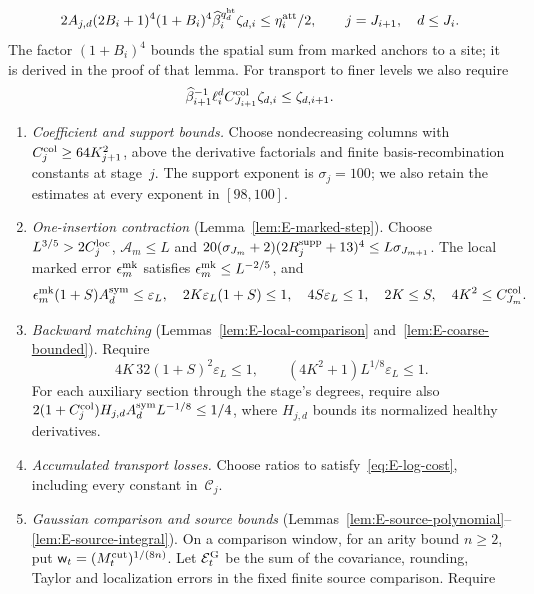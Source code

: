 \begin{equation}\label{eq:E-attachment-allowance}
 2A_{j,d}(2B_i+1)^4(1+B_i)^4
 \widehat\beta_i^{q^{\rm ht}_d}\zeta_{d,i}\le\eta^{\rm att}_i/2,
 \qquad j=J_{i+1},\quad d\le J_i.
\end{equation}
The factor $(1+B_i)^4$ bounds the spatial sum from marked anchors to a site; it is derived in the proof of that lemma. For transport to finer levels we also require
\begin{equation}\label{eq:E-source-allowance-transport}
 \widehat\beta_{i+1}^{-1}\ell_i^d C^{\rm col}_{J_{i+1}}\zeta_{d,i}
 \le\zeta_{d,i+1}.
\end{equation}
\begin{enumerate}
\item\label{it:E-columns} \emph{Coefficient and support bounds.} Choose nondecreasing columns with $C^{\rm col}_j\ge64K_{j+1}^2$, above the derivative factorials and finite basis-recombination constants at stage~$j$. The support exponent is $\sigma_j=100$; we also retain the estimates at every exponent in $[98,100]$.
\item\label{it:E-graph} \emph{One-insertion contraction} (Lemma~\ref{lem:E-marked-step}). Choose $L^{3/5}>2C_j^{\rm loc}$, $\mathcal A_m\le L$ and $20(\sigma_{J_m}+2)(2R_j^{\rm supp}+13)^4\le L\sigma_{J_{m+1}}$. The local marked error $\epsilon^{\rm mk}_m$ satisfies $\epsilon^{\rm mk}_m\le L^{-2/5}$, and
\begin{equation}\label{eq:E-graph-reserve}
 \epsilon^{\rm mk}_m(1+S)A_d^{\rm sym}\le\varepsilon_L,\quad
 2K\varepsilon_L(1+S)\le1,\quad4S\varepsilon_L\le1,\quad
 2K\le S,\quad4K^2\le C^{\rm col}_{J_m}.
\end{equation}
\item\label{it:E-match} \emph{Backward matching} (Lemmas~\ref{lem:E-local-comparison} and~\ref{lem:E-coarse-bounded}). Require
\begin{equation}\label{eq:E-matching-choices}
 4K\,32(1+S)^2\varepsilon_L\le1,\qquad
 (4K^2+1)L^{1/8}\varepsilon_L\le1.
\end{equation}
For each auxiliary section through the stage's degrees, require also $2(1+C^{\rm col}_j)H_{j,d}A_d^{\rm sym}L^{-1/8}\le1/4$, where $H_{j,d}$ bounds its normalized healthy derivatives.
\item\label{it:E-log} \emph{Accumulated transport losses.} Choose ratios to satisfy~\eqref{eq:E-log-cost}, including every constant in~$\mathcal C_j$.
\item\label{it:E-entries} \emph{Gaussian comparison and source bounds} (Lemmas~\ref{lem:E-source-polynomial}--\ref{lem:E-source-integral}). On a comparison window, for an arity bound $n\ge2$, put $\mathsf w_t=(M^{\mathrm{cut}}_t)^{1/(8n)}$. Let $\mathcal E_t^{\rm G}$ be the sum of the covariance, rounding, Taylor and localization errors in the fixed finite source comparison. Require

\end{enumerate}
